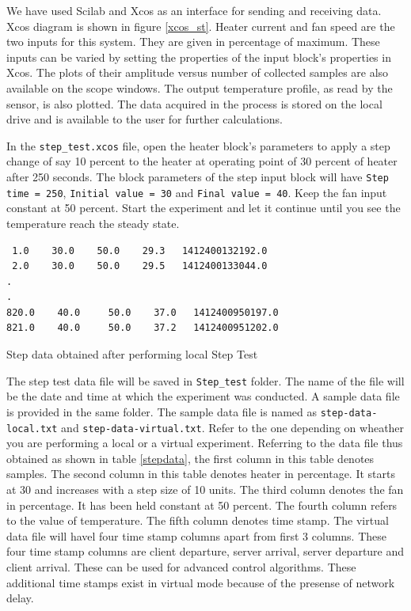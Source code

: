 We have used Scilab and Xcos as an interface for sending and receiving data. 
Xcos diagram is shown in figure \ref{xcos_st}. Heater current and fan speed are the two inputs for this system. 
They are given in percentage of maximum. These inputs can be varied by setting the properties of the input block's properties 
in Xcos. The plots of their amplitude versus number of collected samples are also available on the scope windows. 
The output temperature profile, as read by the sensor, is also plotted. The data acquired in the process is stored on the 
local drive and is available to the user for further calculations.

 In the {\tt step\_test.xcos} file, open the heater block's parameters to apply a step change of say 10 percent to the heater at operating point of 30 percent of heater after 250 seconds. The block parameters of the step input block will have {\tt Step time = 250}, {\tt Initial value = 30} and {\tt Final value = 40}. 
Keep the fan input constant at 50 percent. Start the experiment and let it continue until you see the temperature 
reach the steady state. 

\begin{table}
\begin{verbatim}
 1.0    30.0    50.0    29.3   1412400132192.0
 2.0    30.0    50.0    29.5   1412400133044.0
.
.
820.0    40.0     50.0    37.0   1412400950197.0
821.0    40.0     50.0    37.2   1412400951202.0
\end{verbatim}
\caption{Step data obtained after performing local Step Test}
\label{stepdata}
\end{table}

The step test data file will be saved in {\tt Step\_test} folder. The name of the file will be the date and time at which the experiment was conducted. A sample data file is provided in the same folder. The sample data file is named as {\tt step-data-local.txt} and {\tt step-data-virtual.txt}. Refer to the one depending on wheather you are performing a local or a virtual experiment. Referring to the data file thus obtained as shown in table \ref{stepdata}, the first column in this table denotes samples. The second column in this table denotes heater in percentage. It starts at 30 and increases with a step size of 10 units. The third column denotes the fan in percentage. It has been held constant at 50 percent. The fourth column refers to the value of temperature. The fifth column denotes time stamp. The virtual data file will havel four time stamp columns apart from first 3 columns. These four time stamp columns are client departure, server arrival, server departure and client arrival. These can be used for advanced control algorithms. These additional time stamps exist in virtual mode because of the presense of network delay.
